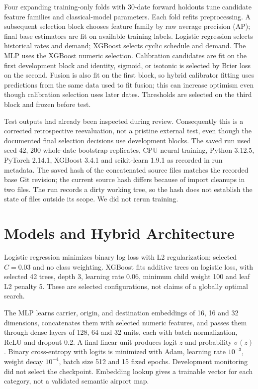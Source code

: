 \documentclass[conference]{IEEEtran}
\begin{document}
Four expanding training-only folds with 30-date forward holdouts tune candidate feature families and classical-model parameters. Each fold refits preprocessing. A subsequent selection block chooses feature family by raw average precision (AP); final base estimators are fit on available training labels. Logistic regression selects historical rates and demand; XGBoost selects cyclic schedule and demand. The MLP uses the XGBoost numeric selection. Calibration candidates are fit on the first development block and identity, sigmoid, or isotonic is selected by Brier loss on the second. Fusion is also fit on the first block, so hybrid calibrator fitting uses predictions from the same data used to fit fusion; this can increase optimism even though calibration selection uses later dates. Thresholds are selected on the third block and frozen before test.

Test outputs had already been inspected during review. Consequently this is a corrected retrospective reevaluation, not a pristine external test, even though the documented final selection decisions use development blocks. The saved run used seed 42, 200 whole-date bootstrap replicates, CPU neural training, Python 3.12.5, PyTorch 2.14.1, XGBoost 3.4.1 and scikit-learn 1.9.1 as recorded in run metadata. The saved hash of the concatenated source files matches the recorded base Git revision; the current source hash differs because of import cleanups in two files. The run records a dirty working tree, so the hash does not establish the state of files outside its scope. We did not rerun training.
\section{Models and Hybrid Architecture}
Logistic regression minimizes binary log loss with L2 regularization; selected $C=0.03$ and no class weighting. XGBoost fits additive trees on logistic loss, with selected 42 trees, depth 3, learning rate 0.06, minimum child weight 100 and leaf L2 penalty 5. These are selected configurations, not claims of a globally optimal search.

The MLP learns carrier, origin, and destination embeddings of 16, 16 and 32 dimensions, concatenates them with selected numeric features, and passes them through dense layers of 128, 64 and 32 units, each with batch normalization, ReLU and dropout 0.2. A final linear unit produces logit $z$ and probability $\sigma(z)$. Binary cross-entropy with logits is minimized with Adam, learning rate $10^{-3}$, weight decay $10^{-4}$, batch size 512 and 15 fixed epochs. Development monitoring did not select the checkpoint. Embedding lookup gives a trainable vector for each category, not a validated semantic airport map.
\end{document}
